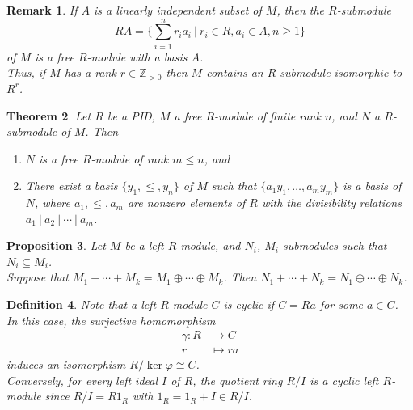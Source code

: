 \documentclass[a4paper,8pt]{article}
\newcommand{\Z}{\mathbb{Z}}
\theoremstyle{theorem}
\newtheorem{theorem}{Theorem}[subsection]
\newtheorem{proposition}[theorem]{Proposition}
\newtheorem{definition}[theorem]{Definition}
\newtheorem{remark}[theorem]{Remark}
\begin{document}
\begin{remark}
If $A$ is a linearly independent subset of $M$, then the $R$-submodule
\begin{equation}
RA = \{\sum_{i=1}^n r_i a_i \ | \ r_i \in R, a_i \in A, n\geq 1\} \nonumber
\end{equation}
of $M$ is a free $R$-module with a basis $A$.\\
Thus, if $M$ has a rank $r \in \Z_{>0}$ then $M$ contains an $R$-submodule isomorphic to $R^r$.
\end{remark}

\begin{theorem}
Let $R$ be a PID, $M$ a free $R$-module of finite rank $n$, and $N$ a $R$-submodule of $M$. Then
\begin{enumerate}[label=(\roman*)]
\item $N$ is a free $R$-module of rank $m \leq n$, and
\item There exist a basis $\{y_1, \leq, y_n\}$ of $M$ such that $\{a_1 y_1, \ldots, a_m y_m\}$ is a basis of $N$, where $a_1, \leq, a_m$ are nonzero elements of $R$ with the divisibility relations $a_1 \ | \ a_2 \ | \ \cdots \ | \ a_m$.
\end{enumerate}
\end{theorem}

\begin{proposition}
Let $M$ be a left $R$-module, and $N_i$, $M_i$ submodules such that $N_i \subseteq M_i$.\\
Suppose that $M_1 + \cdots + M_k = M_1 \oplus \cdots \oplus M_k$. Then $N_1 + \cdots + N_k = N_1 \oplus \cdots \oplus N_k$.
\end{proposition}

\begin{definition}
Note that a left $R$-module $C$ is cyclic if $C=Ra$ for some $a \in C$.\\
In this case, the surjective homomorphism
\begin{align}
\gamma: R &\rightarrow C \nonumber \\
r &\mapsto ra \nonumber
\end{align}
induces an isomorphism $R/\ker \varphi \cong C$.\\
Conversely, for every left ideal $I$ of $R$, the quotient ring $R/I$ is a cyclic left $R$-module since $R/I = R \overline{1_R}$ with $\overline{1_R} = 1_R + I \in R/I$.
\end{definition}
\end{document}

